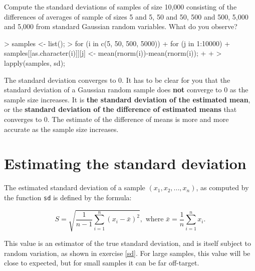 \documentclass[a4paper]{article}
\theoremstyle{definition}
\begin{document}
\begin{Exercise}
Compute the standard deviations of samples of size 10,000 consisting
of the differences of averages of sample of sizes 5 and 5, 50 and 50,
500 and 500, 5,000 and 5,000 from standard Gaussian random
variables. What do you observe?
\end{Exercise}
\begin{Answer}
\begin{Schunk}
\begin{Sinput}
> samples <- list();
> for (i in c(5, 50, 500, 5000)) {
+    for (j in 1:10000) {
+       samples[[as.character(i)]][j] <- mean(rnorm(i))-mean(rnorm(i));
+    }
+ }
> lapply(samples, sd);
\end{Sinput}
\end{Schunk}
\par
The standard deviation converges to 0. It has to be clear for you
that the standard deviation of a Gaussian random sample does
\textbf{not} converge to 0 as the sample size increases. It is
\textbf{the standard deviation of the estimated mean}, or the
\textbf{standard deviation of the difference of estimated means}
that converges to 0. The estimate of the difference of means is more
and more accurate as the sample size increases.
\end{Answer}


\section{Estimating the standard deviation}

The estimated standard deviation of a sample $(x_1, x_2, ..., x_n)$,
as computed by the function \texttt{sd} is defined by the formula:

\begin{equation}
  S = \sqrt{\frac{1}{n-1}\sum_{i=1}^n(x_i-\bar{x})^2}, \mbox{ where }
    \bar{x} = \frac{1}{n}\sum_{i=1}^n x_i.
\end{equation}

This value is an estimator of the true standard deviation, and is itself
subject to random variation, as shown in exercise \ref{sd}. For large
samples, this value will be close to expected, but for small samples
it can be far off-target.
\end{document}
